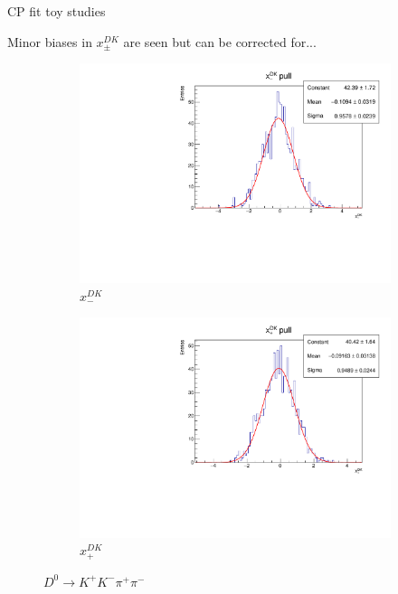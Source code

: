 \documentclass[xcolor={dvipsnames}]{beamer}
\begin{document}
\begin{frame}{CP fit toy studies}
  \begin{center}
    Minor biases in $x_\pm^{DK}$ are seen but can be corrected for...
  \end{center}
  \begin{figure}
    \centering
    \begin{subfigure}{0.5\textwidth}
      \centering
      \includegraphics[width=1.0\textwidth]{Plots/A_xm_dk_pull.pdf}
      \vspace{-0.3cm}
      \caption*{$x_-^{DK}$}
    \end{subfigure}%
    \begin{subfigure}{0.5\textwidth}
      \centering
      \includegraphics[width=1.0\textwidth]{Plots/A_xp_dk_pull.pdf}
      \vspace{-0.3cm}
      \caption*{$x_+^{DK}$}
    \end{subfigure}
    \caption*{$D^0\to K^+K^-\pi^+\pi^-$}
  \end{figure}
\end{frame}
\end{document}
